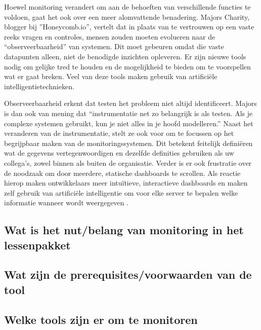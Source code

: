 Hoewel monitoring verandert om aan de behoeften van verschillende functies te voldoen, gaat het ook over een meer alomvattende benadering. Majors Charity, blogger bij ''Honeycomb.io''\autocite{Majors2016}, vertelt dat in plaats van te vertrouwen op een vaste reeks vragen en controles, mensen zouden moeten evolueren naar de “observeerbaarheid” van systemen. Dit moet gebeuren omdat die vaste datapunten alleen, niet de benodigde inzichten opleveren. Er zijn nieuwe tools nodig om gelijke tred te houden en de mogelijkheid te bieden om te voorspellen wat er gaat breken. Veel van deze tools maken gebruik van artificiële intelligentietechnieken. 

Observeerbaarheid erkent dat testen het probleem niet altijd identificeert. Majors is dan ook van mening dat “instrumentatie net zo belangrijk is als testen. Als je complexe systemen gebruikt, kun je niet alles in je hoofd modelleren.” Naast het veranderen van de instrumentatie, stelt ze ook voor om te focussen op het begrijpbaar maken van de monitoringssystemen. Dit betekent feitelijk definiëren wat de gegevens vertegenwoordigen en dezelfde definities gebruiken als uw collega's, zowel binnen als buiten de organisatie. Verder is er ook frustratie over de noodzaak om door meerdere, statische dashboards te scrollen. Als reactie hierop maken ontwikkelaars meer intuïtieve, interactieve dashboards en maken zelf gebruik van artificiële intelligentie om voor elke server te bepalen welke informatie wanneer wordt weergegeven \autocite{Williams2016}.

\subsection{Wat is het nut/belang van monitoring in het lessenpakket}

\subsection{Wat zijn de prerequisites/voorwaarden van de tool}

\subsection{Welke tools zijn er om te monitoren}


